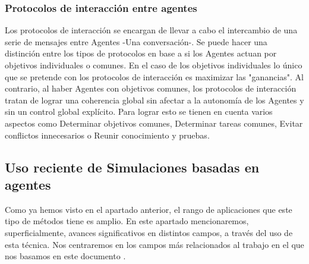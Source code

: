 \subsubsection{Protocolos de interacción entre agentes}

Los protocolos de interacción se encargan de llevar a cabo el intercambio de una serie de mensajes entre Agentes -Una conversación-. Se puede hacer una distinción entre los tipos de protocolos en base a si los Agentes actuan por objetivos individuales o comunes. En el caso de los objetivos individuales lo único que se pretende con los protocolos de interacción es maximizar las "ganancias". Al contrario, al haber Agentes con objetivos comunes, los protocolos de interacción tratan de lograr una coherencia global sin afectar a la autonomía de los Agentes y sin un control global explícito. Para lograr esto se tienen en cuenta varios aspectos como Determinar objetivos comunes, Determinar tareas comunes, Evitar conflictos innecesarios o Reunir conocimiento y pruebas.

\subsection{Uso reciente de Simulaciones basadas en agentes}

Como ya hemos visto en el apartado anterior, el rango de aplicaciones que este tipo de métodos tiene es amplio. En este apartado mencionaremos, superficialmente, avances significativos en distintos campos, a través del uso de esta técnica. Nos centraremos en los campos más relacionados al trabajo en el que nos basamos en este documento \cite{park2023generative}.

